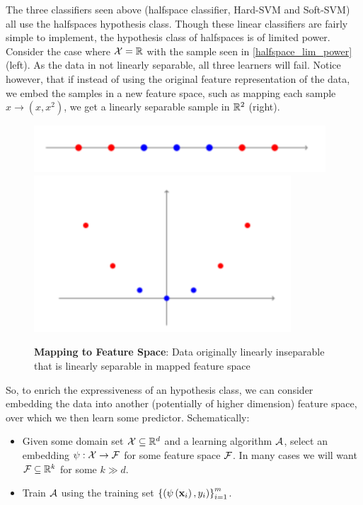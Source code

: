 The three classifiers seen above (halfspace classifier, Hard-SVM and Soft-SVM) all use the halfspaces hypothesis class. Though these linear classifiers are fairly simple to implement, the hypothesis class of halfspaces is of limited power. Consider the case where $\mathcal{X}=\mathbb{R}$ with the sample seen in \autoref{halfspace_lim_power} (left). As the data in not linearly separable, all three learners will fail. Notice however, that if instead of using the original feature representation of the data, we embed the samples in a new feature space, such as mapping each sample $x\rightarrow\left(x,x^2\right)$, we get a linearly separable sample in $\mathbb{R}^2$ (right).
\begin{figure}[H]
	\centering
	\includegraphics{chapters/classification/figures/linearly_inseparable.png}
	\includegraphics{chapters/classification/figures/linearly_separable.png}
	\caption{\textbf{Mapping to Feature Space}: Data originally linearly inseparable that is linearly separable in mapped feature space}\label{halfspace_lim_power}
\end{figure}

So, to enrich the expressiveness of an hypothesis class, we can consider embedding the data into another (potentially of higher dimension) feature space, over which we then learn some predictor. Schematically:
\begin{itemize}
	\item Given some domain set $\mathcal{X}\subseteq\mathbb{R}^d$ and a learning algorithm $\mathcal{A}$, select an embedding  $\psi:\mathcal{X}\rightarrow\mathcal{F}$ for some feature space $\mathcal{F}$. In many cases we will want $\mathcal{F}\subseteq \mathbb{R}^k$ for some $k \gg d$.
	\item Train $\mathcal{A}$ using the training set $\left\{\left(\psi\left(\mathbf{x}_i\right),y_i\right)\right\}^m_{i=1}$.
\end{itemize}~\\

